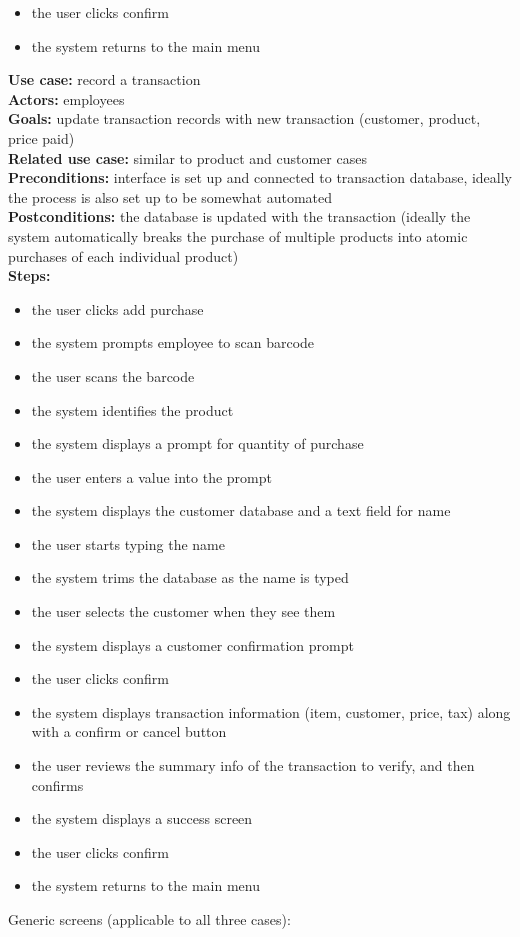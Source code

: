 \documentclass[notitlepage, 11pt]{report}
\begin{document}
\begin{enumerate}[itemindent=-1.5em]
\begin{itemize}
		\item the user clicks confirm 
		\item the system returns to the main menu
		\end{itemize}
	\textbf{Use case:} record a transaction\\
	\textbf{Actors:} employees\\
	\textbf{Goals:} update transaction records with new transaction (customer, product, price paid)\\
	\textbf{Related use case:} similar to product and customer cases\\
	\textbf{Preconditions:} interface is set up and connected to transaction database, ideally the process is also set up to be somewhat automated\\
	\textbf{Postconditions:} the database is updated with the transaction (ideally the system automatically breaks the purchase of multiple products into atomic purchases of each individual product)\\
\newpage
	\textbf{Steps:} 
		\begin{itemize}
		\item the user clicks add purchase
		\item the system prompts employee to scan barcode
		\item the user scans the barcode 
		\item the system identifies the product
		\item the system displays a prompt for quantity of purchase
		\item the user enters a value into the prompt
		\item the system displays the customer database and a text field for name
		\item the user starts typing the name
		\item the system trims the database as the name is typed
		\item the user selects the customer when they see them
		\item the system displays a customer confirmation prompt
		\item the user clicks confirm
		\item the system displays transaction information (item, customer, price, tax) along with a confirm or cancel button
		\item the user reviews the summary info of the transaction to verify, and then confirms
		\item the system displays a success screen
		\item the user clicks confirm
		\item the system returns to the main menu
		\end{itemize}
	\begin{center} 
	Generic screens (applicable to all three cases):
	

\end{center}
\end{enumerate}
\end{document}
